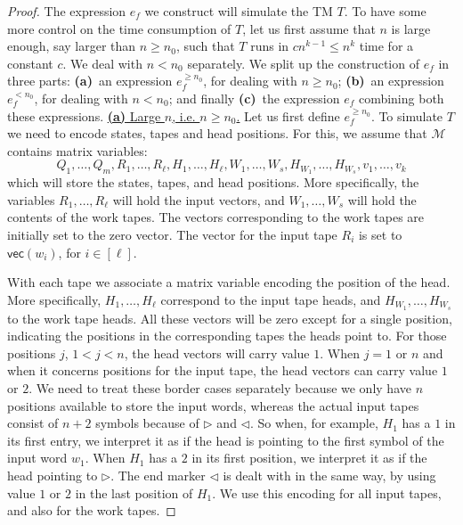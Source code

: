 \begin{proof}
	The expression $e_f$ we construct will simulate the TM $T$. To have some more control on the time consumption of $T$, let us first assume that $n$ is large enough, say larger than $n\geq n_0$, 
	such that $T$ runs in $cn^{k-1}\leq n^{k}$ time for a constant $c$. We deal with $n<n_0$ separately.
 We split up the construction of $e_f$ in three
	parts: \textbf{(a)}~an expression $e_f^{\geq n_0}$, for dealing with $n\geq n_0$; \textbf{(b)}~an expression
	$e_f^{<n_0}$, for dealing with $n<n_0$; and finally \textbf{(c)}~the expression $e_f$ combining both these expressions. 
\medskip
\noindent
\underline{\textbf{(a)} Large $n$, i.e. $n\geq n_0$.}
    Let us first define $e_f^{\geq n_0}$. 
    To simulate $T$ we need to encode states, tapes and head positions. For this, we assume that $\mathcal{M}$ contains matrix variables:
    $$
    Q_1,\ldots,Q_m, R_1,\ldots,R_\ell, H_1,\ldots,H_\ell, W_1,\ldots,W_s, H_{W_1},\ldots,H_{W_s}, v_1,\ldots,v_{k}
    $$
    which will store the states, tapes, and head positions. More specifically, the variables 
    $R_1,\ldots,R_\ell$ will hold the input vectors, and $W_1,\ldots,W_s$ will hold the contents of the work
    tapes.
	The vectors corresponding to the work tapes are initially set to the zero vector. 
    The vector for the input tape $R_i$ is set to $\mathsf{vec}(w_i)$, for $i\in[\ell]$.

\smallskip
    With each tape we associate a matrix variable encoding the position of the head. More specifically, 
    $H_1,\ldots,H_\ell$ correspond to the input tape heads, and
    $H_{W_1},\ldots, H_{W_s}$ to the work tape heads.
    All these vectors will be zero except 
    for a single position, indicating the positions in the corresponding tapes the heads point to. 
    For those positions $j$, $1<j<n$, the head vectors will carry value $1$.  When $j=1$ or $n$ and when 
    it concerns positions for the input tape, the head vectors can carry value $1$ or $2$. We need to treat 
    these border cases separately
    because we only have $n$ positions available to store the input words, whereas the actual input tapes 
    consist of $n+2$ symbols because of $\rhd$ and $\lhd$. So when, for example, $H_1$ has a $1$ in its first
    entry, we interpret it as if the head is pointing to the first symbol of the input word $w_1$. When $H_1$
    has a $2$ in its first position, we interpret it as if the head pointing to $\rhd$. The end marker $\lhd$ is
    dealt with in the same way, by using value $1$ or $2$ in the last position of $H_1$. We use this encoding
    for all input tapes, and also for the work tapes.
    


\end{proof}
